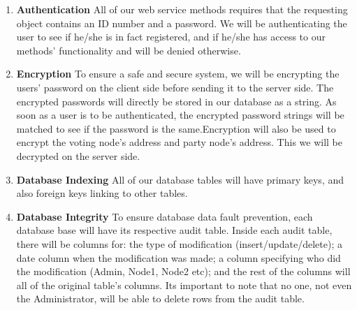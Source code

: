 \begin{enumerate}
		\item\textbf{Authentication}\newline
		All of our web service methods requires that the requesting object contains an ID number and a password. We will be authenticating the user to see if he/she is in fact registered, and if he/she has access to our methods' functionality and will be denied otherwise.
		
		\item\textbf{Encryption}\newline
		To ensure a safe and secure system, we will be encrypting the users' password on the client side before sending it to the server side. The encrypted passwords will directly be stored in our database as a string. As soon as a user is to be authenticated, the encrypted password strings will be matched to see if the password is the same.\newline Encryption will also be used to encrypt the voting node's address and party node's address. This we will be decrypted on the server side.
		
		\item\textbf{Database Indexing}\newline
		All of our database tables will have primary keys, and also foreign keys linking to other tables.
		
		\item\textbf{Database Integrity}\newline
		To ensure database data fault prevention, each database base will have its respective audit table. Inside each audit table, there will be columns for: the type of modification (insert/update/delete); a date column when the modification was made; a column specifying who did the modification (Admin, Node1, Node2 etc); and the rest of the columns will all of the original table's columns. Its important to note that no one, not even the Administrator, will be able to delete rows from the audit table.
\end{enumerate}	